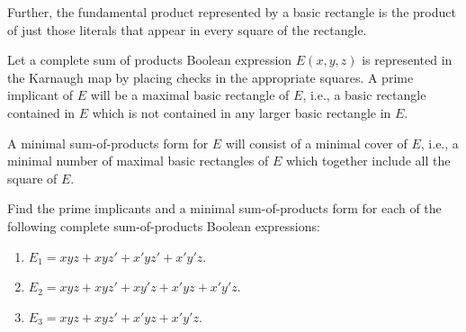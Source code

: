 \documentclass[../main-sheet.tex]{subfiles}
\begin{document}
Further, the fundamental product represented by a basic rectangle is the product of just those literals that appear in every square of the rectangle.

Let a complete sum of products Boolean expression $ E(x, y, z) $ is represented in the Karnaugh map by placing checks in the appropriate squares. A prime implicant of $ E $ will be a maximal basic rectangle of $ E $, i.e., a basic rectangle contained in $ E $ which is not contained in any larger basic rectangle in $ E $.

A minimal sum-of-products form for $ E $ will consist of a minimal cover of $ E $, i.e., a minimal number of maximal basic rectangles of $ E $ which together include all the square of $ E $.
\begin{prob}
    Find the prime implicants and a minimal sum-of-products form for each of the following complete sum-of-products Boolean expressions:
    \begin{enumerate}[label=(\alph*)]
        \item $ E_1 = xyz + xyz' + x' yz' + x' y' z $.
        \item $ E_2 = xyz + xyz' + xy' z + x' yz + x' y' z $.
        \item $ E_3 = xyz + xyz' + x' yz + x' y' z $.
    \end{enumerate}
\end{prob}
\end{document}
